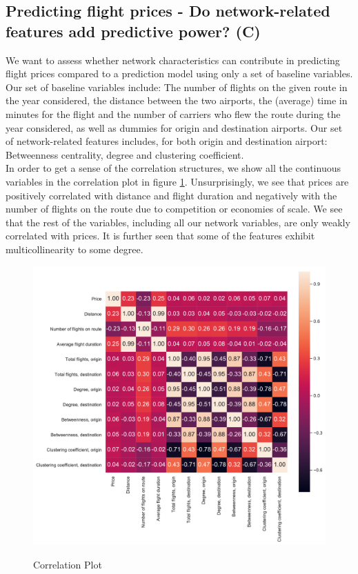 \subsection{Predicting flight prices - Do network-related features add predictive power? (C)}
We want to assess whether network characteristics can contribute in predicting flight prices compared to a prediction model using only a set of baseline variables. Our set of baseline variables include: The number of flights on the given route in the year considered, the distance between the two airports, the (average) time in minutes for the flight and the number of carriers who flew the route during the year considered, as well as dummies for origin and destination airports. Our set of network-related features includes, for both origin and destination airport: Betweenness centrality, degree and clustering coefficient.
\medskip\\
In order to get a sense of the correlation structures, we show all the continuous variables in the correlation plot in figure \ref{fig:correl}. Unsurprisingly, we see that prices are positively correlated with distance and flight duration and negatively with the number of flights on the route due to competition or economies of scale. We see that the rest of the variables, including all our network variables, are only weakly correlated with prices. It is further seen that some of the features exhibit multicollinearity to some degree.
\begin{figure}[H]
  \centering
  \caption{Correlation Plot}
    \includegraphics[width=0.9 \textwidth]{Exam/Figures/corr_plot.pdf}
  \label{fig:correl}
\end{figure}
